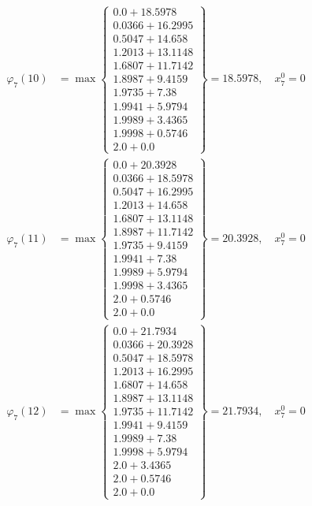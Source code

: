 \documentclass{article}
\begin{document}
\begin{align*}
\varphi_{7}(10) &= \max \left\{ \begin{array}{c}
0.0 + 18.5978 \\
 0.0366 + 16.2995 \\
 0.5047 + 14.658 \\
 1.2013 + 13.1148 \\
 1.6807 + 11.7142 \\
 1.8987 + 9.4159 \\
 1.9735 + 7.38 \\
 1.9941 + 5.9794 \\
 1.9989 + 3.4365 \\
 1.9998 + 0.5746 \\
 2.0 + 0.0
\end{array} \right\}=18.5978, \quad x_{7}^0=0\\
  
\varphi_{7}(11) &= \max \left\{ \begin{array}{c}
0.0 + 20.3928 \\
 0.0366 + 18.5978 \\
 0.5047 + 16.2995 \\
 1.2013 + 14.658 \\
 1.6807 + 13.1148 \\
 1.8987 + 11.7142 \\
 1.9735 + 9.4159 \\
 1.9941 + 7.38 \\
 1.9989 + 5.9794 \\
 1.9998 + 3.4365 \\
 2.0 + 0.5746 \\
 2.0 + 0.0
\end{array} \right\}=20.3928, \quad x_{7}^0=0\\
  
\varphi_{7}(12) &= \max \left\{ \begin{array}{c}
0.0 + 21.7934 \\
 0.0366 + 20.3928 \\
 0.5047 + 18.5978 \\
 1.2013 + 16.2995 \\
 1.6807 + 14.658 \\
 1.8987 + 13.1148 \\
 1.9735 + 11.7142 \\
 1.9941 + 9.4159 \\
 1.9989 + 7.38 \\
 1.9998 + 5.9794 \\
 2.0 + 3.4365 \\
 2.0 + 0.5746 \\
 2.0 + 0.0
\end{array} \right\}=21.7934, \quad x_{7}^0=0\\
  

\end{align*}
\end{document}
